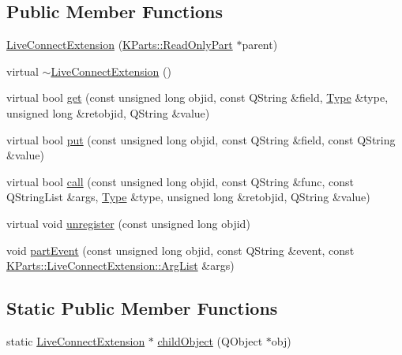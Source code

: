 \subsection*{\-Public \-Member \-Functions}
\begin{DoxyCompactItemize}
\item 
\hyperlink{classKParts_1_1LiveConnectExtension_a11b7499199001f613246861dda90c101}{\-Live\-Connect\-Extension} (\hyperlink{classKParts_1_1ReadOnlyPart}{\-K\-Parts\-::\-Read\-Only\-Part} $\ast$parent)
\item 
virtual \hyperlink{classKParts_1_1LiveConnectExtension_aef598b47d0fc11d1323588c67928da7c}{$\sim$\-Live\-Connect\-Extension} ()
\item 
virtual bool \hyperlink{classKParts_1_1LiveConnectExtension_a91ddec0deaa49516ade1e86d8bbd3b90}{get} (const unsigned long objid, const \-Q\-String \&field, \hyperlink{classKParts_1_1LiveConnectExtension_a8dfff0d5feb20316c714179c9eda9a9c}{\-Type} \&type, unsigned long \&retobjid, \-Q\-String \&value)
\item 
virtual bool \hyperlink{classKParts_1_1LiveConnectExtension_a20088d732c9bf45abf31e9723b263e4f}{put} (const unsigned long objid, const \-Q\-String \&field, const \-Q\-String \&value)
\item 
virtual bool \hyperlink{classKParts_1_1LiveConnectExtension_ac925e087aa86e8e11c7616b8f03551a0}{call} (const unsigned long objid, const \-Q\-String \&func, const \-Q\-String\-List \&args, \hyperlink{classKParts_1_1LiveConnectExtension_a8dfff0d5feb20316c714179c9eda9a9c}{\-Type} \&type, unsigned long \&retobjid, \-Q\-String \&value)
\item 
virtual void \hyperlink{classKParts_1_1LiveConnectExtension_aceb4e2b994572baf1d87f78c7134c42a}{unregister} (const unsigned long objid)
\item 
void \hyperlink{classKParts_1_1LiveConnectExtension_a0cb4efb5b26992f31ae44f3d4a6ba2a1}{part\-Event} (const unsigned long objid, const \-Q\-String \&event, const \hyperlink{classKParts_1_1LiveConnectExtension_a16a7a582605755e47eaab5b37e73d8cb}{\-K\-Parts\-::\-Live\-Connect\-Extension\-::\-Arg\-List} \&args)
\end{DoxyCompactItemize}
\subsection*{\-Static \-Public \-Member \-Functions}
\begin{DoxyCompactItemize}
\item 
static \hyperlink{classKParts_1_1LiveConnectExtension}{\-Live\-Connect\-Extension} $\ast$ \hyperlink{classKParts_1_1LiveConnectExtension_acfe5c3014688d5b0efdc5a1534aacb49}{child\-Object} (\-Q\-Object $\ast$obj)
\end{DoxyCompactItemize}


